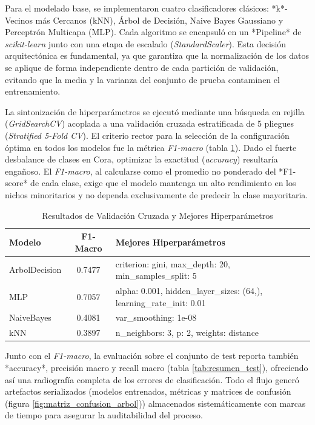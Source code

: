 \documentclass[conference,a4paper]{IEEEtran}
\begin{document}
Para el modelado base, se implementaron cuatro clasificadores clásicos: *k*-Vecinos más Cercanos (kNN), Árbol de Decisión, Naive Bayes Gaussiano y Perceptrón Multicapa (MLP). Cada algoritmo se encapsuló en un *Pipeline* de \textit{scikit-learn} junto
con una etapa de escalado (\textit{StandardScaler}). Esta decisión arquitectónica es fundamental, ya que garantiza que la normalización de los datos se aplique de forma independiente dentro de cada partición de validación, evitando que la media y la 
varianza del conjunto de prueba contaminen el entrenamiento.

La sintonización de hiperparámetros se ejecutó mediante una búsqueda en rejilla (\textit{GridSearchCV}) acoplada a una validación cruzada estratificada de 5 pliegues (\textit{Stratified 5-Fold CV}). El criterio rector para la selección de la 
configuración óptima en todos los modelos fue la métrica \textit{F1-macro} (tabla \ref{tab:best_models}). Dado el fuerte desbalance de clases en Cora, optimizar la exactitud (\textit{accuracy}) resultaría engañoso. El \textit{F1-macro}, al calcularse como el promedio no ponderado
del *F1-score* de cada clase, exige que el modelo mantenga un alto rendimiento en los nichos minoritarios y no dependa exclusivamente de predecir la clase mayoritaria.

\begin{table}[htbp]
\caption{Resultados de Validación Cruzada y Mejores Hiperparámetros}
\label{tab:best_models}
\centering
\begin{tabular}{@{} l c p{4.5cm} @{}}
\toprule
\textbf{Modelo} & \textbf{F1-Macro} & \textbf{Mejores Hiperparámetros} \\
\midrule
ArbolDecision & 0.7477 & criterion: gini, max\_depth: 20, min\_samples\_split: 5 \\
\addlinespace
MLP & 0.7057 & alpha: 0.001, hidden\_layer\_sizes: (64,), learning\_rate\_init: 0.01 \\
\addlinespace
NaiveBayes & 0.4081 & var\_smoothing: 1e-08 \\
\addlinespace
kNN & 0.3897 & n\_neighbors: 3, p: 2, weights: distance \\
\bottomrule
\end{tabular}
\end{table}

Junto con el \textit{F1-macro}, la evaluación sobre el conjunto de test reporta también *accuracy*, precisión macro y recall macro (tabla \ref{tab:resumen_test}), ofreciendo así una radiografía completa de los errores de clasificación. Todo el flujo generó artefactos serializados 
(modelos entrenados, métricas y matrices de confusión (figura \ref{fig:matriz_confusion_arbol})) almacenados sistemáticamente con marcas de tiempo para asegurar la auditabilidad del proceso.
\end{document}
